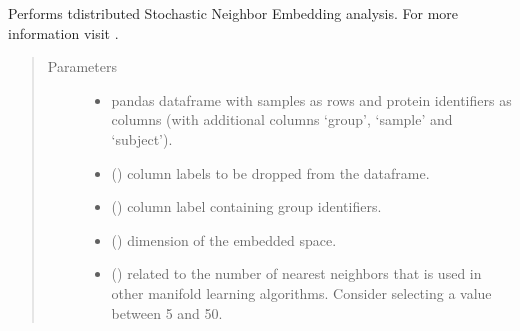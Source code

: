 \documentclass[letterpaper,10pt,english]{sphinxmanual}
\begin{document}
\begin{fulllineitems}
\label{\detokenize{_autosummary/analytics_core.analytics:analytics_core.analytics.analytics.run_tsne}}
Performs t\sphinxhyphen{}distributed Stochastic Neighbor Embedding analysis. For more information visit .
\begin{quote}\begin{description}
\item[{Parameters}] \leavevmode\begin{itemize}
\item {} 
 \textendash{} pandas dataframe with samples as rows and protein identifiers as columns (with additional columns ‘group’, ‘sample’ and ‘subject’).

\item {} 
 () \textendash{} column labels to be dropped from the dataframe.

\item {} 
 () \textendash{} column label containing group identifiers.

\item {} 
 () \textendash{} dimension of the embedded space.

\item {} 
 () \textendash{} related to the number of nearest neighbors that is used in other manifold learning algorithms. Consider selecting a value between 5 and 50.


\end{itemize}
\end{description}
\end{quote}
\end{fulllineitems}
\end{document}
